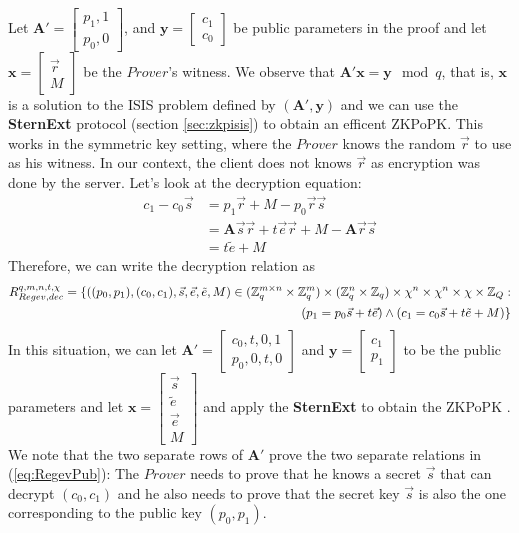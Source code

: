 Let $\mathbf{A}' = \begin{bmatrix}
  p_1, 1\\
  p_0, 0
\end{bmatrix}
$, and $\mathbf{y} = \begin{bmatrix}
  c_1\\c_0
\end{bmatrix}$ be public parameters in the proof and
let $\mathbf{x} = \begin{bmatrix}
  \vec{r}\\
  M
\end{bmatrix}$
be the $Prover$'s witness. We observe that $\mathbf{A'}\mathbf{x}= \mathbf{y} \mod q$, that is, $\mathbf{x}$ is a solution
to the ISIS problem defined by $(\mathbf{A'},\mathbf{y})$ and we can use the \textbf{SternExt} protocol (section
\ref{sec:zkpisis}) to obtain an efficent ZKPoPK. This works in the symmetric key setting, where the $Prover$ knows
the random $\vec{r}$ to use as his witness. In our context, the client does not knows $\vec{r}$ as encryption was
done by the server. Let's look at the decryption equation:
\begin{align*}
  c_1 - c_0\vec{s} &= p_1\vec{r} + M - p_0\vec{r}\vec{s} \\
                   &= \mathbf{A}\vec{s}\vec{r} + t\vec{e}\vec{r} + M - \mathbf{A}\vec{r}\vec{s}\\
                   &= t\tilde{e} + M
\end{align*}
Therefore, we can write the decryption relation as
\begin{align}
  \label{eq:RegevPub}
  R_{Regev,dec}^{q,m,n,t,\chi} = \{ ((p_0,p_1),(c_0,c_1),\vec{s},\vec{e},\tilde{e}, M) \in (\mathbb{Z}_q^{m \times n} \times \mathbb{Z}_q^{m})
  \times (\mathbb{Z}_q^n \times \mathbb{Z}_q) \times \chi^n \times \chi^n \times \chi \times \mathbb{Z}_Q :\\ \nonumber
  (p_1 = p_0\vec{s} + t\vec{e}) \land (c_1 = c_0\vec{s} + t\tilde{e} + M) \}
\end{align}
In this situation, we can let $\mathbf{A'} = \begin{bmatrix}
  c_0, t, 0 , 1 \\p_0, 0, t, 0
\end{bmatrix}
$
and $\mathbf{y} = \begin{bmatrix}
  c_1\\p_1
\end{bmatrix}$
to be the public parameters and let $\mathbf{x} = \begin{bmatrix}
  \vec{s}\\ \tilde{e}\\ \vec{e}\\ M
\end{bmatrix}
$ and apply the \textbf{SternExt} to obtain the ZKPoPK  . We note that the two separate rows of $\mathbf{A'}$ prove the two
separate relations in (\ref{eq:RegevPub}): The $Prover$ needs to prove that he knows a secret $\vec{s}$ that can decrypt
$(c_0,c_1)$ and he also needs to prove that the secret key $\vec{s}$ is also the one corresponding to the public key
$(p_0, p_1)$.


